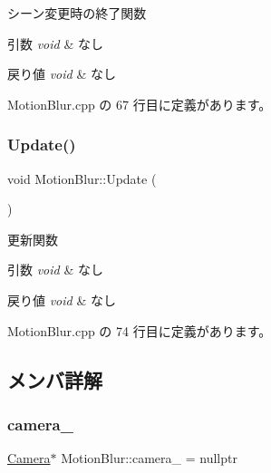 シーン変更時の終了関数 


\begin{DoxyParams}{引数}
{\em void} & なし \\
\hline
\end{DoxyParams}

\begin{DoxyRetVals}{戻り値}
{\em void} & なし \\
\hline
\end{DoxyRetVals}


 Motion\+Blur.\+cpp の 67 行目に定義があります。

\mbox{\label{class_motion_blur_a931793c39ebeed7da3406f3aeaa7452e}} 
\subsubsection{\texorpdfstring{Update()}{Update()}}
{\footnotesize\ttfamily void Motion\+Blur\+::\+Update (\begin{DoxyParamCaption}{ }\end{DoxyParamCaption})}



更新関数 


\begin{DoxyParams}{引数}
{\em void} & なし \\
\hline
\end{DoxyParams}

\begin{DoxyRetVals}{戻り値}
{\em void} & なし \\
\hline
\end{DoxyRetVals}


 Motion\+Blur.\+cpp の 74 行目に定義があります。



\subsection{メンバ詳解}
\mbox{\label{class_motion_blur_a1e43ed8f5b0ae775221695807b68ae8f}} 
\subsubsection{\texorpdfstring{camera\+\_\+}{camera\_}}
{\footnotesize\ttfamily \mbox{\hyperlink{class_camera}{Camera}}$\ast$ Motion\+Blur\+::camera\+\_\+ = nullptr\hspace{0.3cm}{\ttfamily [private]}}



